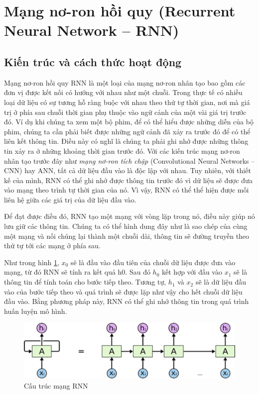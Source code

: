 \section{Mạng nơ-ron hồi quy (Recurrent Neural Network – RNN)}
\subsection{Kiến trúc và cách thức hoạt động}
Mạng nơ-ron hồi quy RNN là một loại của mạng nơ-ron nhân tạo bao gồm các đơn vị được kết nối có hướng với nhau như một chuỗi. Trong thực tế có nhiều loại dữ liệu có sự tương hỗ ràng buộc với nhau theo thứ tự thời gian, nơi mà giá trị ở phía sau chuỗi thời gian phụ thuộc vào ngữ cảnh của một vài giá trị trước đó. Ví dụ khi chúng ta xem một bộ phim, để có thể hiểu được những diễn của bộ phim, chúng ta cần phải biết được những ngữ cảnh đã xảy ra trước đó để có thể liên kết thông tin. Điều này có nghĩ là chúng ta phải ghi nhớ được những thông tin xảy ra ở những khoảng thời gian trước đó. Với các kiến trúc mạng nơ-ron nhân tạo trước đây như \textit{mạng nơ-ron tích chập} (Convolutional Neural Networks – CNN) hay ANN, tất cả dữ liệu đầu vào là độc lập với nhau. Tuy nhiên, với thiết kế của mình, RNN có thể ghi nhớ được thông tin trước đó vì dữ liệu sẽ được đưa vào mạng theo trình tự thời gian của nó. Vì vậy, RNN có thể thể hiện được mối liên hệ giữa các giá trị của dữ liệu đầu vào.

Để đạt được điều đó, RNN tạo một mạng với vòng lặp trong nó, điều này giúp nó lưu giữ các thông tin. Chúng ta có thể hình dung đây như là sao chép của cùng một mạng và nối chúng lại thành một chuỗi dài, thông tin sẽ đường truyền theo thứ tự tới các mạng ở phía sau.

Như trong hình \ref{fig:2-6}, $x_{0}$ sẽ là đầu vào đầu tiên của chuỗi dữ liệu được đưa vào mạng, từ đó RNN sẽ tính ra kết quả h0. Sau đó $h_{0}$  kết hợp với đầu vào $x_{1}$ sẽ là thông tin để tính toán cho bước tiếp theo. Tương tự, $h_{1}$ và $x_{2}$ sẽ là dữ liệu đầu vào của bước tiếp theo và quá trình sẽ được lặp như vậy cho hết chuỗi dữ liệu đầu vào. Bằng phương pháp này, RNN có thể ghi nhớ thông tin trong quá trình huấn luyện mô hình.

\begin{figure}[H]
    \centering
    \includegraphics[scale=0.75]{./content/images/2-6.png}
    \caption{Cấu trúc mạng RNN}
    \label{fig:2-6}
\end{figure}

